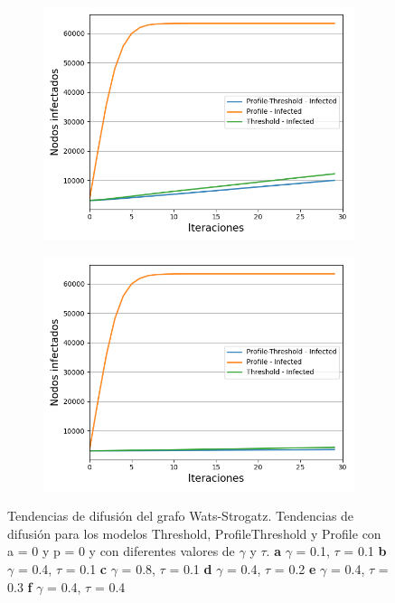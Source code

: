 \documentclass{article}
\begin{document}
\begin{figure}[!tbp]
\begin{subfigure}[b]{0.5\textwidth}
		\includegraphics[width=\textwidth]{../Images/Fig 3 e).png}
		\caption{}
		\label{fig:f35}
	\end{subfigure}
	\hfill
	\begin{subfigure}[b]{0.5\textwidth}
		\includegraphics[width=\textwidth]{../Images/Fig 3 f).png}
		\caption{}
		\label{fig:f36}
	\end{subfigure}
	\label{fig:FIG3}
	\caption{Tendencias de difusión del grafo Wats-Strogatz. Tendencias de difusión para los modelos Threshold, ProfileThreshold y Profile con a = 0 y p = 0 y con diferentes valores de $\gamma$ y $\tau$.
		\textbf{a} $\gamma$ = 0.1, $\tau$ = 0.1 \textbf{b} $\gamma$ = 0.4, $\tau$ = 0.1 \textbf{c} $\gamma$ = 0.8, $\tau$ = 0.1 \textbf{d} $\gamma$ = 0.4, $\tau$ = 0.2 \textbf{e} $\gamma$ = 0.4, $\tau$ = 0.3 \textbf{f} $\gamma$ = 0.4, $\tau$ = 0.4}
\end{figure}
\end{document}
